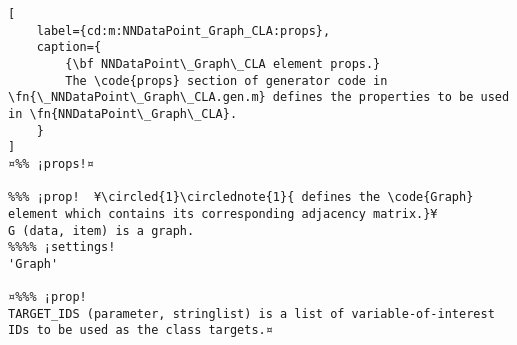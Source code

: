 \documentclass{tufte-handout}
\begin{document}
\begin{lstlisting}[
	label={cd:m:NNDataPoint_Graph_CLA:props},
	caption={
		{\bf NNDataPoint\_Graph\_CLA element props.}
		The \code{props} section of generator code in \fn{\_NNDataPoint\_Graph\_CLA.gen.m} defines the properties to be used in \fn{NNDataPoint\_Graph\_CLA}.
	}
]
¤%% ¡props!¤

%%% ¡prop!  ¥\circled{1}\circlednote{1}{ defines the \code{Graph} element which contains its corresponding adjacency matrix.}¥
G (data, item) is a graph.
%%%% ¡settings!
'Graph'

¤%%% ¡prop!
TARGET_IDS (parameter, stringlist) is a list of variable-of-interest IDs to be used as the class targets.¤

\end{lstlisting}

\clearpage
\end{document}
